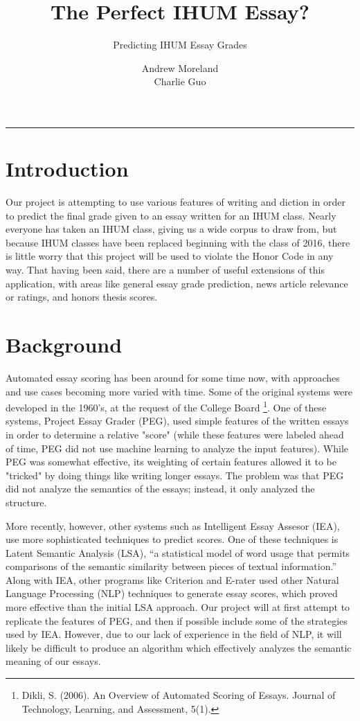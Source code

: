 \documentclass[11pt,twocolumn]{scrartcl}
\title{The Perfect IHUM Essay?}
\subtitle{Predicting IHUM Essay Grades}
\author{Andrew Moreland \\ Charlie Guo}
\date{}
\begin{document}
\maketitle

\vspace{-0.3in}
\rule{\linewidth}{0.4pt}
\setlength{\parskip}{10pt plus 1pt minus 1pt}

\section{Introduction}
Our project is attempting to use various features of writing and diction in order to predict the final grade given to an essay written for an IHUM class. Nearly everyone has taken an IHUM class, giving us a wide corpus to draw from, but because IHUM classes have been replaced beginning with the class of 2016, there is little worry that this project will be used to violate the Honor Code in any way. That having been said, there are a number of useful extensions of this application, with areas like general essay grade prediction, news article relevance or ratings, and honors thesis scores. 

\section{Background}

Automated essay scoring has been around for some time now, with approaches and use cases becoming more varied with time. Some of the original systems were developed in the 1960's, at the request of the College Board \footnote{Dikli, S. (2006). An Overview of Automated Scoring of Essays. Journal of Technology, Learning, and Assessment, 5(1).}. One of these systems, Project Essay Grader (PEG), used simple features of the written essays in order to determine a relative "score" (while these features were labeled ahead of time, PEG did not use machine learning to analyze the input features). While PEG was somewhat effective, its weighting of certain features allowed it to be "tricked" by doing things like writing longer essays. The problem was that PEG did not analyze the semantics of the essays; instead, it only analyzed the structure.

More recently, however, other systems such as Intelligent Essay Assesor (IEA), use more sophisticated techniques to predict scores. One of these techniques is Latent Semantic Analysis (LSA), “a statistical model of word usage that permits comparisons of the semantic similarity between pieces of textual information.” Along with IEA, other programs like Criterion and E-rater used other Natural Language Processing (NLP) techniques to generate essay scores, which proved more effective than the initial LSA approach. Our project will at first attempt to replicate the features of PEG, and then if possible include some of the strategies used by IEA. However, due to our lack of experience in the field of NLP, it will likely be difficult to produce an algorithm which effectively analyzes the semantic meaning of our essays. 
\end{document}

